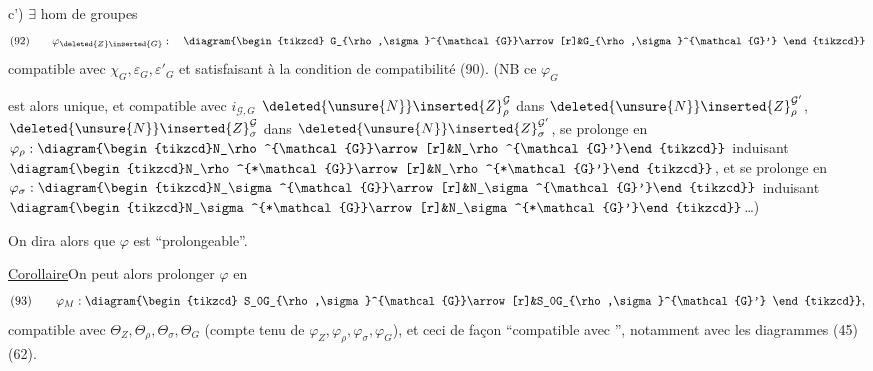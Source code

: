 c') \(\exists\) hom de groupes
\[
(92)\qquad
\varphi_{\deleted{Z}\inserted{G}}:\quad
\diagram{\begin{tikzcd}
G_{\rho,\sigma}^{\mathcal{G}}\arrow[r]&G_{\rho,\sigma}^{\mathcal{G}'}
\end{tikzcd}}
\]
compatible avec \(\chi_G,\varepsilon_G,\varepsilon'_G\) et satisfaisant à la
condition de compatibilité (90). (NB ce \(\varphi_G\)


est alors unique, et compatible avec \(i_{\mathcal{G},G}\)
\unsure{;}
\(\deleted{\unsure{N}}\inserted{Z}_\rho^{\mathcal{G}}\) dans
\(\deleted{\unsure{N}}\inserted{Z}_\rho^{\mathcal{G}'}\),
\(\deleted{\unsure{N}}\inserted{Z}_\sigma^{\mathcal{G}}\) dans
\(\deleted{\unsure{N}}\inserted{Z}_\sigma^{\mathcal{G}'}\),
 se prolonge en
\(\varphi_\rho:\diagram{\begin{tikzcd}N_\rho^{\mathcal{G}}\arrow[r]&N_\rho^{\mathcal{G}'}\end{tikzcd}}\)
induisant
\(\diagram{\begin{tikzcd}N_\rho^{*\mathcal{G}}\arrow[r]&N_\rho^{*\mathcal{G}'}\end{tikzcd}}\),
et se prolonge en
\(\varphi_\sigma:\diagram{\begin{tikzcd}N_\sigma^{\mathcal{G}}\arrow[r]&N_\sigma^{\mathcal{G}'}\end{tikzcd}}\)
induisant
\(\diagram{\begin{tikzcd}N_\sigma^{*\mathcal{G}}\arrow[r]&N_\sigma^{*\mathcal{G}'}\end{tikzcd}}\)\ldots)


On dira alors que \(\varphi\) est ``prolongeable''.

\uline{Corollaire}\quad On peut alors prolonger \(\varphi\) en
\[
(93)\qquad\varphi_M:
\diagram{\begin{tikzcd}
S_0G_{\rho,\sigma}^{\mathcal{G}}\arrow[r]&S_0G_{\rho,\sigma}^{\mathcal{G}'}
\end{tikzcd}},
\]
compatible avec \(\Theta_Z,\Theta_\rho,\Theta_\sigma,\Theta_G\)
(compte tenu de \(\varphi_Z,\varphi_\rho,\varphi_\sigma,\varphi_G\)),
et ceci de façon ``compatible avec '', notamment
avec les diagrammes (45) (62).

